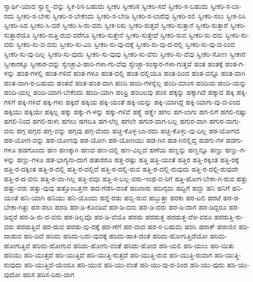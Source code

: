 {ಸ್ವಾರ್ಥಿ-ಯಾದ
ಸ್ವಾಸ್ಥ್ಯ-ವನ್ನು
ಸ್ವಿಕ-ರಿಸ-ಬಹುದು
ಸ್ವೀಕರಿ
ಸ್ವೀಕರಿಸ
ಸ್ವೀಕರಿ-ಸದೆ
ಸ್ವೀಕರಿ-ಸ-ಬಹುದು
ಸ್ವೀಕರಿ-ಸ-ಬಾ-ರದು
ಸ್ವೀಕರಿ-ಸ-ಬೇಕು
ಸ್ವೀಕರಿ-ಸ-ಬೇಕೆಂದು
ಸ್ವೀಕರಿ-ಸ-ಬೇಡಿ
ಸ್ವೀಕರಿ-ಸ-ಲಾರೆವು
ಸ್ವೀಕರಿ-ಸಲಿ
ಸ್ವೀಕರಿ-ಸಲು
ಸ್ವೀಕ-ರಿಸಿ
ಸ್ವೀಕರಿ-ಸಿದ
ಸ್ವೀಕರಿ-ಸಿ-ದರೆ
ಸ್ವೀಕರಿ-ಸಿ-ರು-ವರು
ಸ್ವೀಕ-ರಿಸು
ಸ್ವೀಕರಿ-ಸುತ್ತದೆ
ಸ್ವೀಕರಿ-ಸುತ್ತಾನೆ
ಸ್ವೀಕರಿ-ಸುತ್ತಾರೆ
ಸ್ವೀಕರಿ-ಸುತ್ತಾರೆಯೊ
ಸ್ವೀಕರಿ-ಸುತ್ತಿ-ರುವ-ವರೆಗೂ
ಸ್ವೀಕರಿ-ಸುತ್ತೇನೆ
ಸ್ವೀಕರಿ-ಸುತ್ತೇವೆ
ಸ್ವೀಕರಿ-ಸುವ
ಸ್ವೀಕರಿ-ಸು-ವನು
ಸ್ವೀಕರಿ-ಸು-ವರು
ಸ್ವೀಕರಿ-ಸು-ವ-ವನು
ಸ್ವೀಕರಿ-ಸು-ವಿರಿ
ಸ್ವೀಕರಿ-ಸು-ವು-ದಕ್ಕೆ
ಸ್ವೀಕರಿ-ಸು-ವು-ದ-ರಲ್ಲಿ
ಸ್ವೀಕರಿ-ಸು-ವು-ದ-ರಿಂದ
ಸ್ವೀಕರಿ-ಸು-ವು-ದಿಲ್ಲ
ಸ್ವೀಕರಿ-ಸು-ವುದು
ಸ್ವೀಕರಿ-ಸು-ವುವು
ಸ್ವೀಕರಿ-ಸು-ವೆನು
ಸ್ವೀಕರಿ-ಸು-ವೆವು
ಸ್ವೀಕರಿ-ಸೋಣ
ಸ್ವೀಕಾರ
ಸ್ವೀಕಾರಕ್ಕೂ
ಸ್ವೀಕಾರ-ವನ್ನು
ಸ್ವೇಚ್ಛಾವಿ-ಹಾರಿ-ಗಳಾ-ಗು-ವೆವು
ಸ್ವೇಚ್ಛಾ-ಸಂಸ್ಕಾರ-ಗಳಾ-ಗುತ್ತವೆ
ಹಂತ
ಹಂತಕ್ಕೆ
ಹಂತ-ಗ-ಳನ್ನು
ಹಂತ-ಗಳಲ್ಲಿ
ಹಂತ-ಗಳಿವೆ
ಹಂತ-ಗಳೂ
ಹಂತ-ದಲ್ಲಿ
ಹಂತ-ದಲ್ಲಿಯೂ
ಹಂತ-ದಿಂದ
ಹಂತ-ವನ್ನೂ
ಹಂತ-ವಾಗಿ
ಹಂತ-ವಾಗಿ-ರ-ಬಹುದು
ಹಂತವೆ
ಹಂತ-ಹಂತ-ವಾಗಿ
ಹಂದಿ
ಹಂದಿ-ಗಳನ್ನೆಲ್ಲ
ಹಂದಿ-ಮಾಂಸ
ಹಂದಿಯ
ಹಂದಿ-ಯನ್ನು
ಹಂದಿ-ಯಲ್ಲ
ಹಂದಿ-ಯಾಗ-ಬೇಕೆಂದು
ಹಂದಿ-ಯಾಗಿ
ಹಂಫ್ರಿ
ಹಂಬಲವು
ಹಂಸ
ಹಕ್ಕನ್ನು
ಹಕ್ಕಾಗಿದೆ
ಹಕ್ಕಾದ
ಹಕ್ಕಿ
ಹಕ್ಕಿ-ಗಳಿಗೆ
ಹಕ್ಕಿ-ಗಳಿವೆ
ಹಕ್ಕಿ-ಗಳು
ಹಕ್ಕಿದೆ
ಹಕ್ಕಿಯ
ಹಕ್ಕಿ-ಯಂತೆ
ಹಕ್ಕಿ-ಯನ್ನು
ಹಕ್ಕಿ-ಯಾಗಿದ್ದೆ
ಹಕ್ಕಿ-ಯಾಗು-ವು-ದ-ರಿಂದ
ಹಕ್ಕಿಯು
ಹಕ್ಕಿಯೇ
ಹಕ್ಕಿಲ್ಲ
ಹಕ್ಕು
ಹಕ್ಕು-ಗ-ಳನ್ನು
ಹಕ್ಕು-ಗಳಿವೆ
ಹಕ್ಸ್ಲೆ
ಹಕ್ಸ್ಲೇ
ಹಗಲ
ಹಗ-ಲಾಗು
ಹಗ-ಲಿಗೆ
ಹಗಲಿ-ನಷ್ಟು
ಹಗಲಿ-ನಿಂದ
ಹಗಲಿ-ರುಳು
ಹಗಲು
ಹಗಲೂ
ಹಗ-ಲೆಲ್ಲ
ಹಗಲೇ
ಹಗುರ-ವಾಗ-ಬಲ್ಲ
ಹಗುರ-ವಾಗಿ
ಹಗುರ-ವಾಗು-ವನು
ಹಗ್ಗ
ಹಗ್ಗದ
ಹಗ್ಗ-ವನ್ನು
ಹಗ್ಗವು
ಹಗ್ಗ-ವೆಂದು
ಹಚ್ಚಿ-ಕೊಳ್ಳ-ಬಾ-ರದು
ಹಚ್ಚಿ-ಕೊಳ್ಳು-ವು-ದಿಲ್ಲ
ಹಠ-ಯೋಗದ
ಹಠ-ಯೋಗ-ವನ್ನು
ಹಠ-ಯೋಗವು
ಹಠ-ಯೋಗಿ
ಹಠ-ಯೋಗಿಯು
ಹಡ-ಗಿನ
ಹಡ-ಗಿನಲ್ಲಿದ್ದ
ಹಡಗು-ಗಳ
ಹಡಗು-ಗಳೂ
ಹಡಗೊಂದು
ಹಣ
ಹಣಕ್ಕಾಗಿ
ಹಣದ
ಹಣ-ದಲ್ಲಿ
ಹಣ-ವಿಲ್ಲದೆ
ಹಣೆಯ
ಹಣ್ಣನ್ನು
ಹಣ್ಣನ್ನೂ
ಹಣ್ಣು
ಹಣ್ಣು-ಗ-ಳನ್ನು
ಹಣ್ಣು-ಗಳೂ
ಹತ-ಭಾಗ್ಯನಾ-ದಾಗ
ಹತಾಶರೂ
ಹತ್ತ-ರಷ್ಟು
ಹತ್ತಿ
ಹತ್ತಿ-ಯಂತೆ
ಹತ್ತಿರ
ಹತ್ತಿ-ರಕ್ಕಿಂತ
ಹತ್ತಿ-ರಕ್ಕೆ
ಹತ್ತಿ-ರ-ದಕ್ಕಿಂತ
ಹತ್ತಿ-ರ-ದಲ್ಲಿ
ಹತ್ತಿ-ರ-ದಲ್ಲಿದೆ
ಹತ್ತಿ-ರ-ದಲ್ಲಿ-ರುವ
ಹತ್ತಿ-ರ-ದಲ್ಲಿ-ರುವುದು
ಹತ್ತಿ-ರ-ದಲ್ಲಿ-ರುವುದೇ
ಹತ್ತಿ-ರ-ದ-ವನು
ಹತ್ತಿ-ರ-ವಾ-ಗಿಲ್ಲ
ಹತ್ತಿ-ರವೂ
ಹತ್ತಿ-ಸ-ಬಲ್ಲ-ವರು-ಇಂಥ-ವ-ರಿಗೆ
ಹತ್ತಿ-ಹೋಗ-ಬೇಕಾ-ಗಿ-ರುವ
ಹತ್ತು
ಹತ್ತು-ವರು
ಹತ್ತು-ವುವು
ಹತ್ತೊಂಬತ್ತನೇ
ಹದ-ಗೆಡೆಸಿ-ದಂತೆ
ಹದಿನಾರು
ಹದಿನೈದು
ಹದ್ದಿಗೆ
ಹದ್ದು
ಹನಿ
ಹನಿಗೆ
ಹನಿ-ಯಂತೆ
ಹನಿ-ಯಾಗಿ
ಹನಿಯು
ಹನಿ-ಯೊಂದು
ಹನ್ನೆ-ರಡು
ಹಬ್ಬಿ-ರುವ
ಹಬ್ಬುತ್ತಾ
ಹರಕು
ಹರ-ಟಲಿ
ಹರಟೆ
ಹರ-ಡ-ಬೇಕಾ-ಗಿತ್ತು
ಹರ-ಡಲು
ಹರಡಿ
ಹರ-ಡಿ-ಕೊಂಡಿವೆ
ಹರ-ಡಿ-ದನು
ಹರ-ಡಿ-ದರು
ಹರ-ಡಿ-ದಾಗ
ಹರ-ಡಿದ್ದರೂ
ಹರ-ಡಿದ್ದರೆ
ಹರ-ಡಿ-ರು-ವ-ವನು
ಹರ-ಡಿಲ್ಲವೊ
ಹರ-ಡಿ-ವೆಯೊ
ಹರಡು
ಹರಡುತ್ತ
ಹರಡುತ್ತ-ವೆಆ-ವರೂ
ಹರಡುತ್ತಿ-ರು-ವರು
ಹರಡುತ್ತಿವೆ
ಹರ-ಡುವ
ಹರಡು-ವು-ದಕ್ಕೆ
ಹರ-ಣೆಗೆ
ಹರ-ವಾದ
ಹರ-ಸ-ಬಹುದು
ಹರಸಿ
ಹರಾಕ್
ಹರಾಜಿನ
ಹರಿ-ದಾಡುವ
ಹರಿ-ದಿದೆ
ಹರಿದು
ಹರಿದು-ಬರು-ವುದಕ್ಕೆ
ಹರಿದು-ಹಾಕಿ-ದಂತೆ
ಹರಿದು-ಹೋಗುತ್ತಿದೆಯೋ
ಹರಿದು-ಹೋಗುತ್ತಿವೆ
ಹರಿದು-ಹೋಗುವ
ಹರಿದು-ಹೋಗು-ವಂತೆ
ಹರಿದು-ಹೋದ
ಹರಿ-ಯಲಿ
ಹರಿ-ಯಲು
ಹರಿ-ಯಿತು
ಹರಿಯು
ಹರಿ-ಯುತ್ತದೆ
ಹರಿ-ಯುತ್ತಿದೆ
ಹರಿ-ಯುತ್ತಿ-ರುತ್ತದೆ
ಹರಿ-ಯುತ್ತಿ-ರುವ
ಹರಿ-ಯುತ್ತಿ-ರುವಾಗ
ಹರಿ-ಯುತ್ತಿ-ರುವುದು
ಹರಿ-ಯುತ್ತಿವೆ-ಯೆಂದೂ
ಹರಿ-ಯುವ
ಹರಿ-ಯು-ವಂತೆ
ಹರಿ-ಯು-ವು-ದ-ರಿಂದ
ಹರಿ-ಯು-ವುದು
ಹರಿ-ಯು-ವುದೋ
ಹರಿಸ
ಹರಿಸ-ದಿರು-ವಾಗ
}
